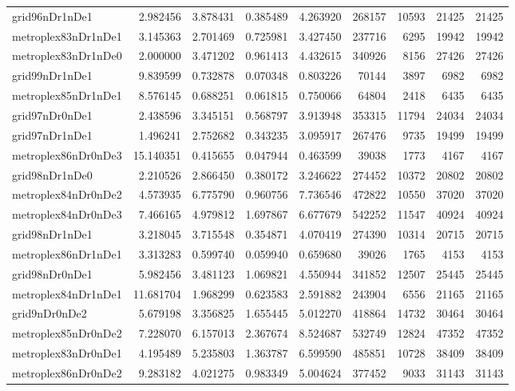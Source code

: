 \begin{longtable}{|l|r|r|r|r|r|r|r|r|}
grid96nDr1nDe1 & 2.982456 & 3.878431 & 0.385489 & 4.263920 & 268157 & 10593 & 21425 & 21425 \\
metroplex83nDr1nDe1 & 3.145363 & 2.701469 & 0.725981 & 3.427450 & 237716 & 6295 & 19942 & 19942 \\
metroplex83nDr1nDe0 & 2.000000 & 3.471202 & 0.961413 & 4.432615 & 340926 & 8156 & 27426 & 27426 \\
grid99nDr1nDe1 & 9.839599 & 0.732878 & 0.070348 & 0.803226 & 70144 & 3897 & 6982 & 6982 \\
metroplex85nDr1nDe1 & 8.576145 & 0.688251 & 0.061815 & 0.750066 & 64804 & 2418 & 6435 & 6435 \\
grid97nDr0nDe1 & 2.438596 & 3.345151 & 0.568797 & 3.913948 & 353315 & 11794 & 24034 & 24034 \\
grid97nDr1nDe1 & 1.496241 & 2.752682 & 0.343235 & 3.095917 & 267476 & 9735 & 19499 & 19499 \\
metroplex86nDr0nDe3 & 15.140351 & 0.415655 & 0.047944 & 0.463599 & 39038 & 1773 & 4167 & 4167 \\
grid98nDr1nDe0 & 2.210526 & 2.866450 & 0.380172 & 3.246622 & 274452 & 10372 & 20802 & 20802 \\
metroplex84nDr0nDe2 & 4.573935 & 6.775790 & 0.960756 & 7.736546 & 472822 & 10550 & 37020 & 37020 \\
metroplex84nDr0nDe3 & 7.466165 & 4.979812 & 1.697867 & 6.677679 & 542252 & 11547 & 40924 & 40924 \\
grid98nDr1nDe1 & 3.218045 & 3.715548 & 0.354871 & 4.070419 & 274390 & 10314 & 20715 & 20715 \\
metroplex86nDr1nDe1 & 3.313283 & 0.599740 & 0.059940 & 0.659680 & 39026 & 1765 & 4153 & 4153 \\
grid98nDr0nDe1 & 5.982456 & 3.481123 & 1.069821 & 4.550944 & 341852 & 12507 & 25445 & 25445 \\
metroplex84nDr1nDe1 & 11.681704 & 1.968299 & 0.623583 & 2.591882 & 243904 & 6556 & 21165 & 21165 \\
grid9nDr0nDe2 & 5.679198 & 3.356825 & 1.655445 & 5.012270 & 418864 & 14732 & 30464 & 30464 \\
metroplex85nDr0nDe2 & 7.228070 & 6.157013 & 2.367674 & 8.524687 & 532749 & 12824 & 47352 & 47352 \\
metroplex83nDr0nDe1 & 4.195489 & 5.235803 & 1.363787 & 6.599590 & 485851 & 10728 & 38409 & 38409 \\
metroplex86nDr0nDe2 & 9.283182 & 4.021275 & 0.983349 & 5.004624 & 377452 & 9033 & 31143 & 31143 \\

\end{longtable}
